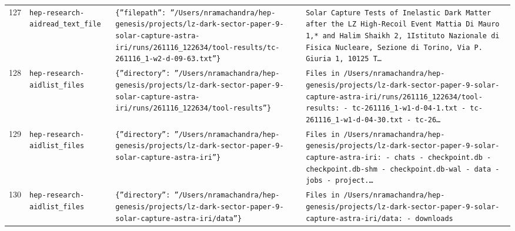 \documentclass[11pt,a4paper]{article}
\begin{document}
\begin{longtable}{@{}p{}p{}p{}p{}@{}}
127 & \texttt{hep-research-aid}\newline\texttt{read\_\allowbreak{}text\_\allowbreak{}file} & \texttt{\{''filepath'':\allowbreak{} ''/\allowbreak{}Users/\allowbreak{}nramachandra/\allowbreak{}hep-genesis/\allowbreak{}projects/\allowbreak{}lz-dark-sector-paper-9-solar-capture-astra-iri/\allowbreak{}runs/\allowbreak{}261116\_\allowbreak{}122634/\allowbreak{}tool-results/\allowbreak{}tc-261116\_\allowbreak{}1-w2-d-09-63.txt''\}\allowbreak{}} & \texttt{Solar Capture Tests of Inelastic Dark Matter after the LZ High-Recoil Event Mattia Di Mauro 1,\allowbreak{}* and Halim Shaikh 2,\allowbreak{}\dag{}\allowbreak{} 1Istituto Nazionale di Fisica Nucleare,\allowbreak{} Sezione di Torino,\allowbreak{} Via P. Giuria 1,\allowbreak{} 10125 T\ldots{}\allowbreak{}} \\
128 & \texttt{hep-research-aid}\newline\texttt{list\_\allowbreak{}files} & \texttt{\{''directory'':\allowbreak{} ''/\allowbreak{}Users/\allowbreak{}nramachandra/\allowbreak{}hep-genesis/\allowbreak{}projects/\allowbreak{}lz-dark-sector-paper-9-solar-capture-astra-iri/\allowbreak{}runs/\allowbreak{}261116\_\allowbreak{}122634/\allowbreak{}tool-results''\}\allowbreak{}} & \texttt{Files in /\allowbreak{}Users/\allowbreak{}nramachandra/\allowbreak{}hep-genesis/\allowbreak{}projects/\allowbreak{}lz-dark-sector-paper-9-solar-capture-astra-iri/\allowbreak{}runs/\allowbreak{}261116\_\allowbreak{}122634/\allowbreak{}tool-results:\allowbreak{}   - tc-261116\_\allowbreak{}1-w1-d-04-1.txt   - tc-261116\_\allowbreak{}1-w1-d-04-30.txt   - tc-26\ldots{}\allowbreak{}} \\
129 & \texttt{hep-research-aid}\newline\texttt{list\_\allowbreak{}files} & \texttt{\{''directory'':\allowbreak{} ''/\allowbreak{}Users/\allowbreak{}nramachandra/\allowbreak{}hep-genesis/\allowbreak{}projects/\allowbreak{}lz-dark-sector-paper-9-solar-capture-astra-iri''\}\allowbreak{}} & \texttt{Files in /\allowbreak{}Users/\allowbreak{}nramachandra/\allowbreak{}hep-genesis/\allowbreak{}projects/\allowbreak{}lz-dark-sector-paper-9-solar-capture-astra-iri:\allowbreak{}   - chats   - checkpoint.db   - checkpoint.db-shm   - checkpoint.db-wal   - data   - jobs   - project.\ldots{}\allowbreak{}} \\
130 & \texttt{hep-research-aid}\newline\texttt{list\_\allowbreak{}files} & \texttt{\{''directory'':\allowbreak{} ''/\allowbreak{}Users/\allowbreak{}nramachandra/\allowbreak{}hep-genesis/\allowbreak{}projects/\allowbreak{}lz-dark-sector-paper-9-solar-capture-astra-iri/\allowbreak{}data''\}\allowbreak{}} & \texttt{Files in /\allowbreak{}Users/\allowbreak{}nramachandra/\allowbreak{}hep-genesis/\allowbreak{}projects/\allowbreak{}lz-dark-sector-paper-9-solar-capture-astra-iri/\allowbreak{}data:\allowbreak{}   - downloads} \\

\end{longtable}
\end{document}
